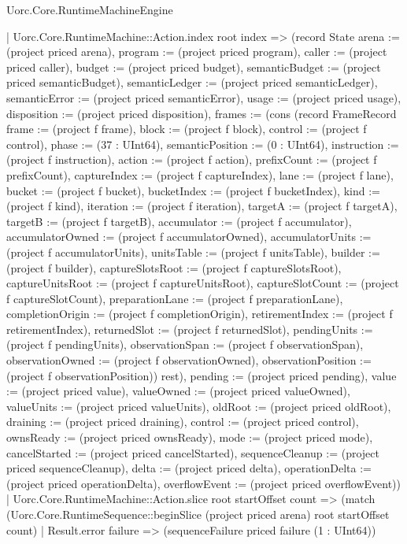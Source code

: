 \begin{lexlean}{Uorc.Core.RuntimeMachineEngine}
\begin{semanticmodule}
{              | Uorc.Core.RuntimeMachine::Action.index root index => (record State {arena := (project priced arena), program := (project priced program), caller := (project priced caller), budget := (project priced budget), semanticBudget := (project priced semanticBudget), semanticLedger := (project priced semanticLedger), semanticError := (project priced semanticError), usage := (project priced usage), disposition := (project priced disposition), frames := (cons (record FrameRecord {frame := (project f frame), block := (project f block), control := (project f control), phase := (37 : UInt64), semanticPosition := (0 : UInt64), instruction := (project f instruction), action := (project f action), prefixCount := (project f prefixCount), captureIndex := (project f captureIndex), lane := (project f lane), bucket := (project f bucket), bucketIndex := (project f bucketIndex), kind := (project f kind), iteration := (project f iteration), targetA := (project f targetA), targetB := (project f targetB), accumulator := (project f accumulator), accumulatorOwned := (project f accumulatorOwned), accumulatorUnits := (project f accumulatorUnits), unitsTable := (project f unitsTable), builder := (project f builder), captureSlotsRoot := (project f captureSlotsRoot), captureUnitsRoot := (project f captureUnitsRoot), captureSlotCount := (project f captureSlotCount), preparationLane := (project f preparationLane), completionOrigin := (project f completionOrigin), retirementIndex := (project f retirementIndex), returnedSlot := (project f returnedSlot), pendingUnits := (project f pendingUnits), observationSpan := (project f observationSpan), observationOwned := (project f observationOwned), observationPosition := (project f observationPosition)}) rest), pending := (project priced pending), value := (project priced value), valueOwned := (project priced valueOwned), valueUnits := (project priced valueUnits), oldRoot := (project priced oldRoot), draining := (project priced draining), control := (project priced control), ownsReady := (project priced ownsReady), mode := (project priced mode), cancelStarted := (project priced cancelStarted), sequenceCleanup := (project priced sequenceCleanup), delta := (project priced delta), operationDelta := (project priced operationDelta), overflowEvent := (project priced overflowEvent)})
              | Uorc.Core.RuntimeMachine::Action.slice root startOffset count => (match (Uorc.Core.RuntimeSequence::beginSlice (project priced arena) root startOffset count)
                | Result.error failure => (sequenceFailure priced failure (1 : UInt64))
}
\end{semanticmodule}
\end{lexlean}
